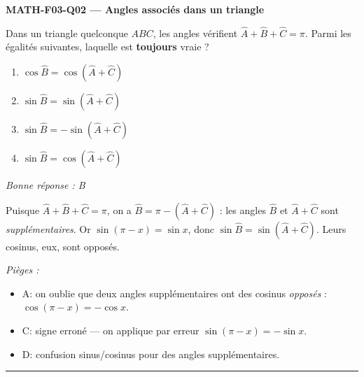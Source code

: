 \documentclass[11pt,a4paper]{article}
\begin{document}
\noindent\textbf{MATH-F03-Q02 --- Angles associés dans un triangle}\par
Dans un triangle quelconque $ABC$, les angles vérifient $\widehat{A}+\widehat{B}+\widehat{C}=\pi$. Parmi les égalités suivantes, laquelle est \textbf{toujours} vraie ?
\begin{enumerate}[label=\Alph*)]
\item $\cos\widehat{B}=\cos\!\left(\widehat{A}+\widehat{C}\right)$
\item $\sin\widehat{B}=\sin\!\left(\widehat{A}+\widehat{C}\right)$
\item $\sin\widehat{B}=-\sin\!\left(\widehat{A}+\widehat{C}\right)$
\item $\sin\widehat{B}=\cos\!\left(\widehat{A}+\widehat{C}\right)$
\end{enumerate}
\textit{Bonne réponse : B}\par
Puisque $\widehat{A}+\widehat{B}+\widehat{C}=\pi$, on a $\widehat{B}=\pi-\left(\widehat{A}+\widehat{C}\right)$ : les angles $\widehat{B}$ et $\widehat{A}+\widehat{C}$ sont \emph{supplémentaires}. Or $\sin(\pi-x)=\sin x$, donc $\sin\widehat{B}=\sin\!\left(\widehat{A}+\widehat{C}\right)$. Leurs cosinus, eux, sont opposés.\par
\textit{Pièges :}
\begin{itemize}
\item A: on oublie que deux angles supplémentaires ont des cosinus \emph{opposés} : $\cos(\pi-x)=-\cos x$.
\item C: signe erroné --- on applique par erreur $\sin(\pi-x)=-\sin x$.
\item D: confusion sinus/cosinus pour des angles supplémentaires.
\end{itemize}
\vspace{8pt}\hrule\vspace{8pt}
\end{document}
